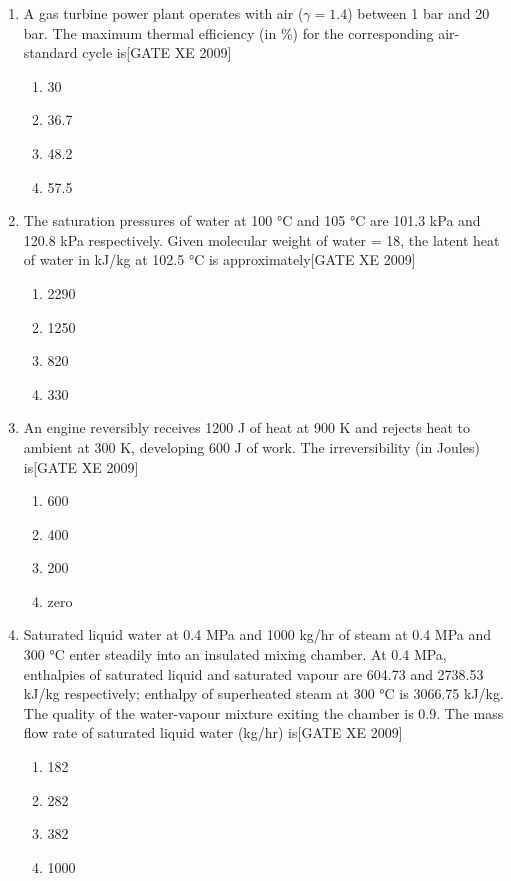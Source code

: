 \documentclass[journal,12pt,onecolumn]{IEEEtran}
\theoremstyle{remark}
\begin{document}
\begin{enumerate}
\item A gas turbine power plant operates with air ($\gamma=1.4$) between 1 bar and 20 bar. The maximum thermal efficiency (in \%) for the corresponding air-standard cycle is\hfill[GATE XE 2009]
\begin{multicols}{2}
\begin{enumerate}
    \item 30
    \item 36.7
    \item 48.2
    \item 57.5
\end{enumerate}
\end{multicols}



\item The saturation pressures of water at 100 °C and 105 °C are 101.3 kPa and 120.8 kPa respectively. Given molecular weight of water = 18, the latent heat of water in kJ/kg at 102.5 °C is approximately\hfill[GATE XE 2009]
\begin{multicols}{2}
\begin{enumerate}
    \item 2290
    \item 1250
    \item 820
    \item 330
\end{enumerate}
\end{multicols}



\item An engine reversibly receives 1200 J of heat at 900 K and rejects heat to ambient at 300 K, developing 600 J of work. The irreversibility (in Joules) is\hfill[GATE XE 2009]
\begin{multicols}{2}
\begin{enumerate}
    \item 600
    \item 400
    \item 200
    \item zero
\end{enumerate}
\end{multicols}



\item Saturated liquid water at 0.4 MPa and 1000 kg/hr of steam at 0.4 MPa and 300 °C enter steadily into an insulated mixing chamber. At 0.4 MPa, enthalpies of saturated liquid and saturated vapour are 604.73 and 2738.53 kJ/kg respectively; enthalpy of superheated steam at 300 °C is 3066.75 kJ/kg. The quality of the water-vapour mixture exiting the chamber is 0.9. The mass flow rate of saturated liquid water (kg/hr) is\hfill[GATE XE 2009]
\begin{multicols}{2}
\begin{enumerate}
    \item 182
    \item 282
    \item 382
    \item 1000
\end{enumerate}
\end{multicols}




\end{enumerate}
\end{document}
